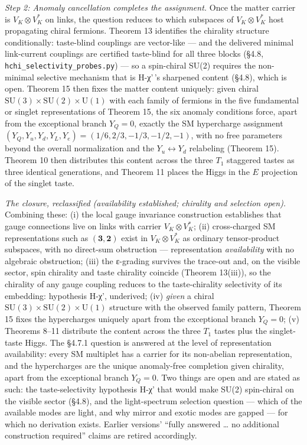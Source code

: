 \documentclass[
]{article}
\begin{document}
\emph{Step 2: Anomaly cancellation completes the assignment.} Once the
matter carrier is \(V_K \otimes V_K^*\) on links, the question reduces
to which subspaces of \(V_K \otimes V_K^*\) host propagating chiral
fermions. Theorem 13 identifies the chirality structure conditionally:
taste-blind couplings are vector-like --- and the delivered minimal
link-current couplings are certified taste-blind for all three blocks
(§4.8, \texttt{hchi\_selectivity\_probes.py}) --- so a spin-chiral SU(2)
requires the non-minimal selective mechanism that is H-χ'\,'s sharpened
content (§4.8), which is open. Theorem 15 then fixes the matter content
uniquely: given chiral
\(\mathrm{SU}(3) \times \mathrm{SU}(2) \times \mathrm{U}(1)\) with each
family of fermions in the five fundamental or singlet representations of
Theorem 15, the six anomaly conditions force, apart from the exceptional
branch \(Y_Q=0\), exactly the SM hypercharge assignment
\((Y_Q, Y_u, Y_d, Y_L, Y_e) = (1/6, 2/3, -1/3, -1/2, -1)\), with no free
parameters beyond the overall normalization and the
\(Y_u \leftrightarrow Y_d\) relabeling (Theorem 15). Theorem 10 then
distributes this content across the three \(T_1\) staggered tastes as
three identical generations, and Theorem 11 places the Higgs in the
\(E\) projection of the singlet taste.

\emph{The closure, reclassified (availability established; chirality and
selection open).} Combining these: (i) the local gauge invariance
construction establishes that gauge connections live on links with
carrier \(V_K \otimes V_K^*\); (ii) cross-charged SM representations
such as \((\mathbf{3}, \mathbf{2})\) exist in \(V_K \otimes V_K^*\) as
ordinary tensor-product subspaces, with no direct-sum obstruction ---
representation \emph{availability} with no algebraic obstruction; (iii)
the ε-grading survives the trace-out and, on the visible sector, spin
chirality and taste chirality coincide (Theorem 13(iii)), so the
chirality of any gauge coupling reduces to the taste-chirality
selectivity of its embedding: hypothesis H-χ', underived; (iv)
\emph{given} a chiral
\(\mathrm{SU}(3) \times \mathrm{SU}(2) \times \mathrm{U}(1)\) structure
with the observed family pattern, Theorem 15 fixes the hypercharges
uniquely apart from the exceptional branch \(Y_Q=0\); (v) Theorems 8--11
distribute the content across the three \(T_1\) tastes plus the
singlet-taste Higgs. The §4.7.1 question is answered at the level of
representation availability: every SM multiplet has a carrier for its
non-abelian representation, and the hypercharges are the unique
anomaly-free completion given chirality, apart from the exceptional
branch \(Y_Q=0\). Two things are open and are stated as such: the
taste-selectivity hypothesis H-χ' that would make SU(2) spin-chiral on
the visible sector (§4.8), and the light-spectrum selection question ---
which of the available modes are light, and why mirror and exotic modes
are gapped --- for which no derivation exists. Earlier versions' ``fully
answered \ldots{} no additional construction required'' claims are
retired accordingly.
\end{document}
